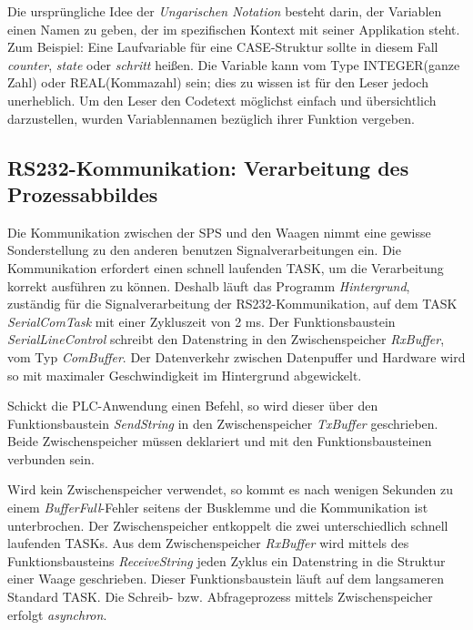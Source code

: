 Die ursprüngliche Idee der \textit{Ungarischen Notation} besteht darin, der Variablen einen Namen zu geben, der  im spezifischen Kontext mit seiner Applikation steht. Zum Beispiel: Eine Laufvariable für eine CASE-Struktur sollte in diesem Fall \textit{counter}, \textit{state} oder \textit{schritt} heißen. Die Variable kann vom Type INTEGER(ganze Zahl) oder REAL(Kommazahl) sein; dies zu wissen ist für den Leser jedoch unerheblich. 
Um den Leser den Codetext möglichst einfach und übersichtlich darzustellen, wurden Variablennamen bezüglich ihrer Funktion vergeben.

\subsection{RS232-Kommunikation: Verarbeitung des Prozessabbildes}
\label{subsec:RS-232}

Die Kommunikation zwischen der SPS und den Waagen nimmt eine gewisse Sonderstellung zu den anderen benutzen Signalverarbeitungen ein. Die Kommunikation erfordert einen schnell laufenden TASK, um die Verarbeitung korrekt ausführen zu können. Deshalb läuft das Programm \textit{Hintergrund}, zuständig für die Signalverarbeitung der RS232-Kommunikation, auf dem TASK \textit{SerialComTask} mit einer Zykluszeit von 2 ms. Der Funktionsbaustein \textit{SerialLineControl} schreibt den Datenstring in den Zwischenspeicher \textit{RxBuffer}, vom Typ \textit{ComBuffer}. Der Datenverkehr zwischen Datenpuffer und Hardware wird so mit maximaler Geschwindigkeit im Hintergrund abgewickelt.

Schickt die PLC-Anwendung einen Befehl, so wird dieser über den Funktionsbaustein \textit{SendString} in den Zwischenspeicher \textit{TxBuffer} geschrieben. Beide Zwischenspeicher müssen deklariert und mit den Funktionsbausteinen verbunden sein. 

Wird kein Zwischenspeicher verwendet, so kommt es nach wenigen Sekunden zu einem \textit{BufferFull}-Fehler seitens der Busklemme und die Kommunikation ist unterbrochen. 
Der Zwischenspeicher entkoppelt die zwei unterschiedlich schnell laufenden TASKs.
Aus dem Zwischenspeicher \textit{RxBuffer} wird mittels des Funktionsbausteins \textit{ReceiveString} jeden Zyklus ein Datenstring in die Struktur einer Waage geschrieben. Dieser Funktionsbaustein läuft auf dem langsameren Standard TASK. Die Schreib- bzw. Abfrageprozess mittels Zwischenspeicher erfolgt \textit{asynchron}.

